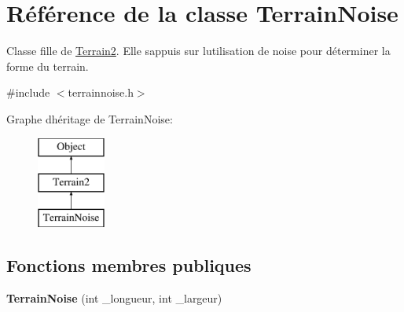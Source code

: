 \hypertarget{class_terrain_noise}{}\section{Référence de la classe Terrain\+Noise}
\label{class_terrain_noise}


Classe fille de \hyperlink{class_terrain2}{Terrain2}. Elle s\textquotesingle{}appuis sur l\textquotesingle{}utilisation de noise pour déterminer la forme du terrain.  




{\ttfamily \#include $<$terrainnoise.\+h$>$}

Graphe d\textquotesingle{}héritage de Terrain\+Noise\+:\begin{figure}[H]
\begin{center}
\leavevmode
\includegraphics[height=3.000000cm]{class_terrain_noise}
\end{center}
\end{figure}
\subsection*{Fonctions membres publiques}
\begin{DoxyCompactItemize}
\item 
\hypertarget{class_terrain_noise_ade7285caeec8d121790159ad6b0af25f}{}{\bfseries Terrain\+Noise} (int \+\_\+longueur, int \+\_\+largeur)\label{class_terrain_noise_ade7285caeec8d121790159ad6b0af25f}

\end{DoxyCompactItemize}
